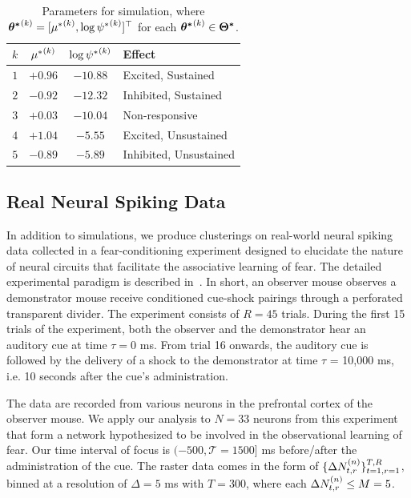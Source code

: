 \documentclass[twoside]{article}
\begin{document}
\begin{table}[h]
\vspace{-3mm}
\caption{Parameters for simulation, where $\bidx {\theta^*}  k = [\idx {\mu^*} k, \log \idx {\psi^*} k]^\top$ for each $\bidx {\theta^*}  k \in \bd {\Theta^*}$.} \label{sim-table}
\begin{center}
\begin{tabular}{c|ccl}
$k$ & $\idx {\mu^*} k$ & $\log \idx {\psi^*} k$ &\textbf{Effect} \\
\hline
$1$ & $+0.96$ & $-10.88$ &  Excited, Sustained \\
$2$ &$-0.92$ & $-12.32$ & Inhibited, Sustained \\
$3$ &$+0.03$ & $-10.04$  & Non-responsive \\
$4$ &$+1.04$ & $-5.55$ & Excited, Unsustained\\
$5$ &$-0.89$ & $-5.89$ & Inhibited, Unsustained
\end{tabular}
\vspace{-4mm}
\end{center}
\end{table}
  
\subsection{Real Neural Spiking Data}
In addition to simulations, we produce clusterings on real-world neural spiking data collected in a fear-conditioning experiment designed to elucidate the nature of neural circuits that facilitate the associative learning of fear. The detailed experimental paradigm is described in~\cite{allsop2018corticoamygdala}.  In short, an observer mouse observes a demonstrator mouse receive conditioned cue-shock pairings through a perforated transparent divider. The experiment consists of $R = 45$ trials. During the first 15 trials of the experiment, both the observer and the demonstrator hear an auditory cue at time $\tau = 0$ ms. From trial 16 onwards, the auditory cue is followed by the delivery of a shock to the demonstrator at time $\tau$ = 10,000 ms, i.e. 10 seconds after the cue's administration. 

The data are recorded from various neurons in the prefrontal cortex of the observer mouse.  We apply our analysis to $N = 33$ neurons from this experiment that form a network hypothesized to be involved in the observational learning of fear.  Our time interval of focus is $(-500, \mathcal{T} = 1500]$ ms before/after the administration of the cue.  The raster data comes in the form of $\{\Delta \idx[t, r] N n\}_{t=1, r=1}^{T, R}$, binned at a resolution of $\Delta = 5$ ms with $T = 300$, where each $\Delta \idx[t, r] N n \leq M = 5$.  
\end{document}
